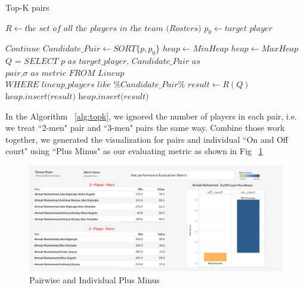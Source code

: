 \documentclass[conference]{IEEEtran}
\begin{document}
\begin{algorithm}
\caption{Top-K pairs}\label{euclid}
\label{alg:topk}
\begin{algorithmic}[1]
\State $R \gets \textit{the set of all the players in the team (Rosters)}$
\State $p_0 \gets \textit{target player}$

    \State $\textit{Continue}$
  \Else
    \State $\textit{Candidate\_Pair} \gets SORT\{p,p_{0}\}$
      \State $heap \gets MinHeap$
    \Else
      \State $heap \gets MaxHeap$
    \EndIf
    \State $\textit{Q =}$ 
    \State $\textit{SELECT p as target\_player, Candidate\_Pair as }$
    \State $\textit{pair,$\sigma$ as metric FROM Lineup}$
    \State $\textit{WHERE lineup\_players like \%Candidate\_Pair\%}$
    \State $result \gets R(Q)$
      \State $\textit{heap.insert(result)}$
      \State $\textit{heap.insert(result)}$
    \EndIf
\EndIf
\EndFor
\EndProcedure
\end{algorithmic}
\end{algorithm}
In the Algorithm ~\ref{alg:topk}, we ignored the number of players in each pair, i.e. we treat ``2-men" pair and ``3-men" pairs the same way. Combine those work together, we generated the visualization for pairs and individual ``On and Off court" using ``Plus Minus" as our evaluating metric as shown in Fig ~\ref{fig:pairs}
\begin{figure}[h!]
  \includegraphics[width=\linewidth]{pairs.jpg}
  \caption{Pairwise and Individual Plus Minus}
  \vspace{-1mm}
  \label{fig:pairs}
\end{figure}
\end{document}
